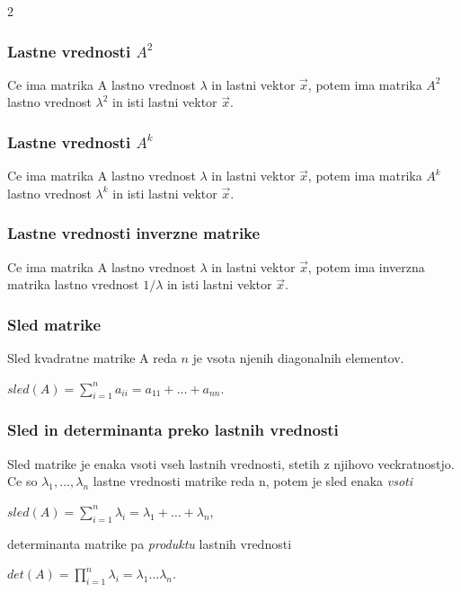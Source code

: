 \documentclass{article}
\begin{document}
\begin{multicols}{2}
	\subsubsection{Lastne vrednosti $A^2$}

	Ce ima matrika A lastno vrednost $\lambda$ in lastni vektor $\vec{x}$, potem ima matrika
	$A^{2}$ lastno vrednost $\lambda^{2}$ in isti lastni vektor $\vec{x}$.

	\subsubsection{Lastne vrednosti $A^k$}

	Ce ima matrika A lastno vrednost $\lambda$ in lastni vektor $\vec{x}$, potem ima
	matrika $A^{k}$ lastno vrednost $\lambda^{k}$ in isti lastni vektor $\vec{x}$.

	\subsubsection{Lastne vrednosti inverzne matrike}

	Ce ima matrika A lastno vrednost $\lambda$ in lastni vektor $\vec{x}$, potem ima
	inverzna matrika lastno vrednost $1 / \lambda$ in isti lastni vektor $\vec{x}$.

	\subsubsection{Sled matrike}

	Sled kvadratne matrike A reda $n$ je vsota njenih diagonalnih elementov.
	\begin{center}
		\begin{math}
			sled(A) =
			\sum_{i=1}^{n} a_{ii} =
			a_{11} + \dots + a_{nn}
		\end{math}.
	\end{center}

	\subsubsection{Sled in determinanta preko lastnih vrednosti}

	Sled matrike je enaka vsoti vseh lastnih vrednosti, stetih z njihovo veckratnostjo.
	Ce so $\lambda_{1}, \dots, \lambda_{n}$ lastne vrednosti matrike reda n, potem je sled enaka \textit{vsoti}
	\begin{center}
		\begin{math}
			sled(A) =
			\sum_{i=1}^{n} \lambda_{i} =
			\lambda_{1} + \dots + \lambda_{n}
		\end{math},
	\end{center}
	determinanta matrike pa \textit{produktu} lastnih vrednosti
	\begin{center}
		\begin{math}
			det(A) =
			\prod_{i=1}^{n} \lambda_{i} =
			\lambda_{1} \dots  \lambda_{n}
		\end{math}.
	\end{center}


\end{multicols}
\end{document}
